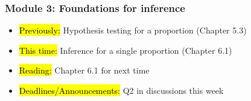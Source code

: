 
\begin{frame}
    \frametitle{Module 3: Foundations for inference}
    \begin{itemize}
        \item \hl{Previously: }Hypothesis testing for a proportion (Chapter 5.3)
        \item \hl{This time: }Inference for a single proportion (Chapter 6.1)
        \item \hl{Reading: }Chapter 6.1 for next time
        \item \hl{Deadlines/Announcements: }Q2 in discussions this week
    \end{itemize}
    
\end{frame}